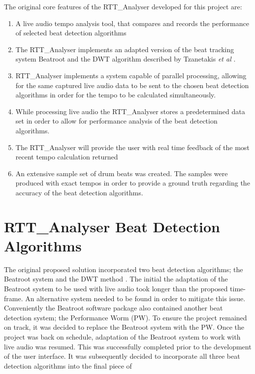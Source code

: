 \documentclass[a4paper, 11pt]{article}
\begin{document}
The original core features of the RTT\_Analyser developed for this project are:

\begin{enumerate}
\item A live audio tempo analysis tool, that compares and records the performance of selected beat detection algorithms
\item The RTT\_Analyser implements an adapted version of the beat tracking system Beatroot and the DWT algorithm described by Tzanetakis \textit{et al} \cite{tzane1}.
\item RTT\_Analyser implements a system capable of parallel processing, allowing for the same captured live audio data to be sent to the chosen beat detection algorithms in order for the tempo to be calculated simultaneously.
\item While processing live audio the RTT\_Analyser stores a predetermined data set in order to allow for performance analysis of the beat detection algorithms.
\item The RTT\_Analyser will provide the user with real time feedback of the most recent tempo calculation returned
\item An extensive sample set of drum beats was created. The samples were produced with exact tempos in order to provide a ground truth regarding the accuracy of the beat detection algorithms. 
\end{enumerate}



\maketitle{}\section{RTT\_Analyser Beat Detection Algorithms}
The original proposed solution incorporated two beat detection algorithms; the Beatroot system \cite{dixon1} and the DWT method \cite{tzane1}. The initial the adaptation of the Beatroot system to be used with live audio took longer than the proposed time-frame. An alternative system needed to be found in order to mitigate this issue. Conveniently the Beatroot software package also contained another beat detection system; the Performance Worm (PW)\cite{dixon3}. To ensure the project remained on track, it was decided to replace the Beatroot system with the PW. Once the project was back on schedule, adaptation of the Beatroot system to work with live audio was resumed. This was successfully completed prior to the development of the user interface. It was subsequently decided to incorporate all three beat detection algorithms into the final piece of
\end{document}
